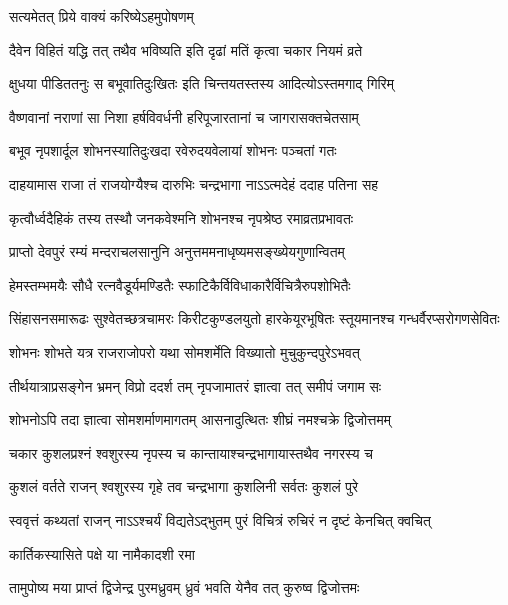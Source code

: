 \onelineshloka
{सत्यमेतत् प्रिये वाक्यं करिष्येऽहमुपोषणम्}%

\twolineshloka
{दैवेन विहितं यद्धि तत् तथैव भविष्यति}
{इति दृढां मतिं कृत्वा चकार नियमं व्रते}%

\twolineshloka
{क्षुधया पीडिततनुः स बभूवातिदुःखितः}
{इति चिन्तयतस्तस्य आदित्योऽस्तमगाद् गिरिम्}%

\twolineshloka
{वैष्णवानां नराणां सा निशा हर्षविवर्धनी}
{हरिपूजारतानां च जागरासक्तचेतसाम्}%

\twolineshloka
{बभूव नृपशार्दूल शोभनस्यातिदुःखदा}
{रवेरुदयवेलायां शोभनः पञ्चतां गतः}%

\twolineshloka
{दाहयामास राजा तं राजयोग्यैश्च दारुभिः}
{चन्द्रभागा नाऽऽत्मदेहं ददाह पतिना सह}%

\twolineshloka
{कृत्वौर्ध्वदैहिकं तस्य तस्थौ जनकवेश्मनि}
{शोभनश्च नृपश्रेष्ठ रमाव्रतप्रभावतः}%

\twolineshloka
{प्राप्तो देवपुरं रम्यं मन्दराचलसानुनि}
{अनुत्तममनाधृष्यमसङ्ख्येयगुणान्वितम्}%

\twolineshloka
{हेमस्तम्भमयैः सौधै रत्नवैडूर्यमण्डितैः}
{स्फाटिकैर्विविधाकारैर्विचित्रैरुपशोभितैः}%

\threelineshloka
{सिंहासनसमारूढः सुश्वेतच्छत्रचामरः}
{किरीटकुण्डलयुतो हारकेयूरभूषितः}
{स्तूयमानश्च गन्धर्वैरप्सरोगणसेवितः }%

\twolineshloka
{शोभनः शोभते यत्र राजराजोपरो यथा}
{सोमशर्मेति विख्यातो मुचुकुन्दपुरेऽभवत्}%

\twolineshloka
{तीर्थयात्राप्रसङ्गेन भ्रमन् विप्रो ददर्श तम्}
{नृपजामातरं ज्ञात्वा तत् समीपं जगाम सः}%

\twolineshloka
{शोभनोऽपि तदा ज्ञात्वा सोमशर्माणमागतम्}
{आसनादुत्थितः शीघ्रं नमश्चक्रे द्विजोत्तमम्}%

\twolineshloka
{चकार कुशलप्रश्नं श्वशुरस्य नृपस्य च}
{कान्तायाश्चन्द्रभागायास्तथैव नगरस्य च}%


\twolineshloka
{कुशलं वर्तते राजन् श्वशुरस्य गृहे तव}
{चन्द्रभागा कुशलिनी सर्वतः कुशलं पुरे}%

\twolineshloka
{स्ववृत्तं कथ्यतां राजन् नाऽऽश्चर्यं विद्यतेऽद्भुतम्}
{पुरं विचित्रं रुचिरं न दृष्टं केनचित् क्वचित्}%

\onelineshloka
{कार्तिकस्यासिते पक्षे या नामैकादशी रमा}%

\twolineshloka
{तामुपोष्य मया प्राप्तं द्विजेन्द्र पुरमध्रुवम्}
{ध्रुवं भवति येनैव तत् कुरुष्व द्विजोत्तमः}%

